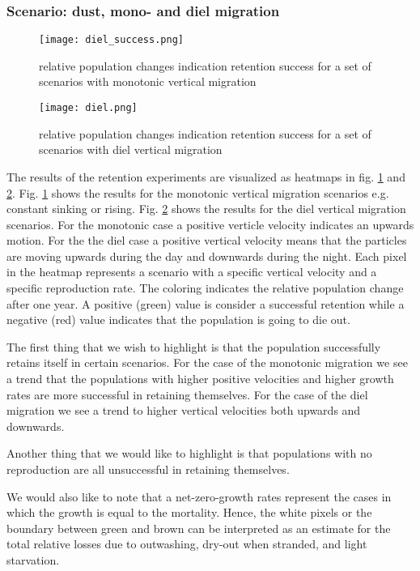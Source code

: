 \subsubsection*{Scenario: dust, mono- and diel migration}

\begin{figure}
    \texttt{[image: diel\_success.png]}
    \caption[]{relative population changes indication retention success for a set of scenarios with monotonic vertical migration}
    \label{fig:monotonic_retention_success}
\end{figure}
\begin{figure}
    \texttt{[image: diel.png]}
    \caption[]{relative population changes indication retention success for a set of scenarios with diel vertical migration}
    \label{fig:diel_retention_success}
\end{figure}

The results of the retention experiments are visualized as heatmaps in fig. \ref{fig:monotonic_retention_success} and \ref{fig:diel_retention_success}.
Fig. \ref{fig:monotonic_retention_success} shows the results for the monotonic vertical migration scenarios e.g. constant sinking or rising.
Fig. \ref{fig:diel_retention_success} shows the results for the diel vertical migration scenarios. For the monotonic case a positive verticle velocity indicates an upwards motion. For the the diel case a positive vertical velocity means that the particles are moving upwards during the day and downwards during the night.
Each pixel in the heatmap represents a scenario with a specific vertical velocity and a specific reproduction rate. The coloring indicates the relative population change after one year. A positive (green) value is consider a successful retention while a negative (red) value indicates that the population is going to die out.

The first thing that we wish to highlight is that the population successfully retains itself in certain scenarios. For the case of the monotonic migration we see a trend that the populations with higher positive velocities and higher growth rates are more successful in retaining themselves.
For the case of the diel migration we see a trend to higher vertical velocities both upwards and downwards.

Another thing that we would like to highlight is that populations with no reproduction are all unsuccessful in retaining themselves.

We would also like to note that a net-zero-growth rates represent the cases in which the growth is equal to the mortality.
Hence, the white pixels or the boundary between green and brown can be interpreted as an estimate for the total relative losses due to outwashing, dry-out when stranded, and light starvation.




